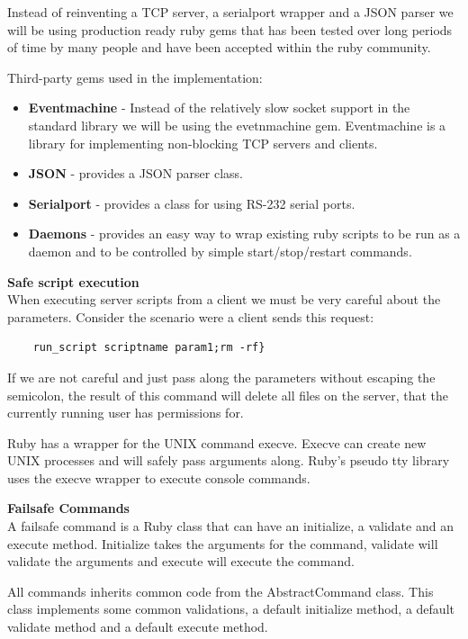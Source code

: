 Instead of reinventing a TCP server, a serialport wrapper and a JSON parser we will be using production ready ruby gems that has been tested over long periods of time by many people and have been accepted within the ruby community.

Third-party gems used in the implementation:
\begin{itemize}
	\item \textbf{Eventmachine} - Instead of the relatively slow socket support in the standard library we will be using the evetnmachine gem. Eventmachine is a library for implementing non-blocking TCP servers and clients.
	\item \textbf{JSON} - provides a JSON parser class.
	\item \textbf{Serialport} - provides a class for using RS-232 serial ports.
	\item \textbf{Daemons} - provides an easy way to wrap existing ruby scripts to be run as a daemon and to be controlled by simple start/stop/restart commands.
\end{itemize}



\textbf{Safe script execution} \\
When executing server scripts from a client we must be very careful about the parameters. Consider the scenario were a client sends this request:
\begin{verbatim}
	run_script scriptname param1;rm -rf}
\end{verbatim}
If we are not careful and just pass along the parameters without escaping the semicolon, the result of this command will delete all files on the server, that the currently running user has permissions for.

Ruby has a wrapper for the UNIX command execve. Execve can create new UNIX processes and will safely pass arguments along.
Ruby's pseudo tty library uses the execve wrapper to execute console commands.

\textbf{Failsafe Commands} \\
A failsafe command is a Ruby class that can have an initialize, a validate and an execute method. Initialize takes the arguments for the command, validate will validate the arguments and execute will execute the command.

All commands inherits common code from the AbstractCommand class. This class implements some common validations, a default initialize method, a default validate method and a default execute method.

